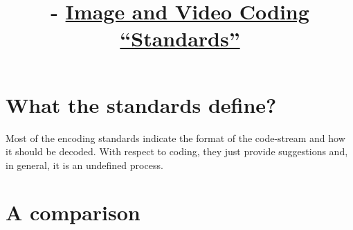 

\title{\SM{} - \href{https://github.com/Sistemas-Multimedia/Sistemas-Multimedia.github.io/tree/master/contents/standards}{Image and Video Coding ``Standards''}}

\maketitle

\tableofcontents

\section{What the standards define?}
Most of the encoding standards indicate the format of the code-stream
and how it should be decoded. With respect to coding, they just provide
suggestions and, in general, it is an undefined process.

\section{A comparison~\cite{wikipedia}}

